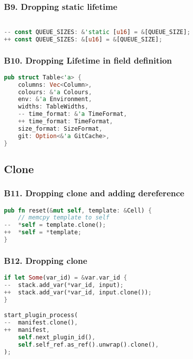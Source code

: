 \documentclass{article}
\begin{document}
\subsubsection{B9. Dropping static lifetime}

\begin{lstlisting}[language=Rust, style=colouredRust, label={l3}]

-- const QUEUE_SIZES: &'static [u16] = &[QUEUE_SIZE];
++ const QUEUE_SIZES: &[u16] = &[QUEUE_SIZE];

\end{lstlisting}

\subsubsection{B10. Dropping Lifetime in field definition}

\begin{lstlisting}[language=Rust, style=colouredRust, label={l3}]
pub struct Table<'a> {
    columns: Vec<Column>,
    colours: &'a Colours,
    env: &'a Environment,
    widths: TableWidths,
    -- time_format: &'a TimeFormat,
    ++ time_format: TimeFormat,
    size_format: SizeFormat,
    git: Option<&'a GitCache>,
}
\end{lstlisting}

\subsection{Clone}
\subsubsection{B11. Dropping clone and adding dereference}

\begin{lstlisting}[language=Rust, style=colouredRust, label={l3}]
pub fn reset(&mut self, template: &Cell) {
    // memcpy template to self
--  *self = template.clone();
++  *self = *template;
}
\end{lstlisting}

\subsubsection{B12. Dropping clone}

\begin{lstlisting}[language=Rust, style=colouredRust, label={l3}]
if let Some(var_id) = &var.var_id {
--  stack.add_var(*var_id, input);
++  stack.add_var(*var_id, input.clone());
}

start_plugin_process(
--  manifest.clone(),
++  manifest,
    self.next_plugin_id(),
    self.self_ref.as_ref().unwrap().clone(),
);

\end{lstlisting}
\end{document}
